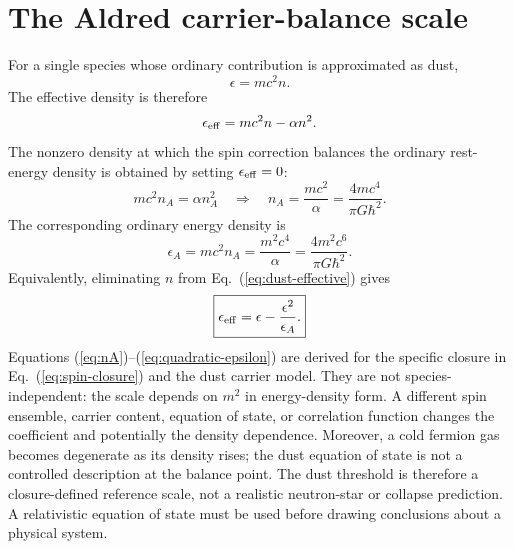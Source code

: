 \documentclass[11pt]{article}
\begin{document}
\section{The Aldred carrier-balance scale}
For a single species whose ordinary contribution is approximated as dust,
\begin{equation}
\epsilon=mc^2n.
\label{eq:dust}
\end{equation}
The effective density is therefore
\begin{equation}
\epsilon_{\rm eff}=mc^2n-\alpha n^2.
\label{eq:dust-effective}
\end{equation}
The nonzero density at which the spin correction balances the ordinary rest-energy density is obtained by setting $\epsilon_{\rm eff}=0$:
\begin{equation}
mc^2n_A=\alpha n_A^2
\quad\Longrightarrow\quad
\boxed{n_A=\frac{mc^2}{\alpha}
=\frac{4mc^4}{\pi G\hbar^2}.}
\label{eq:nA}
\end{equation}
The corresponding ordinary energy density is
\begin{equation}
\boxed{\epsilon_A=mc^2n_A
=\frac{m^2c^4}{\alpha}
=\frac{4m^2c^6}{\pi G\hbar^2}.}
\label{eq:epsilonA}
\end{equation}
Equivalently, eliminating $n$ from Eq.~(\ref{eq:dust-effective}) gives
\begin{equation}
\boxed{\epsilon_{\rm eff}=\epsilon-\frac{\epsilon^2}{\epsilon_A}.}
\label{eq:quadratic-epsilon}
\end{equation}
Equations (\ref{eq:nA})--(\ref{eq:quadratic-epsilon}) are derived for the specific closure in Eq.~(\ref{eq:spin-closure}) and the dust carrier model. They are not species-independent: the scale depends on $m^2$ in energy-density form. A different spin ensemble, carrier content, equation of state, or correlation function changes the coefficient and potentially the density dependence. Moreover, a cold fermion gas becomes degenerate as its density rises; the dust equation of state is not a controlled description at the balance point. The dust threshold is therefore a closure-defined reference scale, not a realistic neutron-star or collapse prediction. A relativistic equation of state must be used before drawing conclusions about a physical system.
\end{document}
